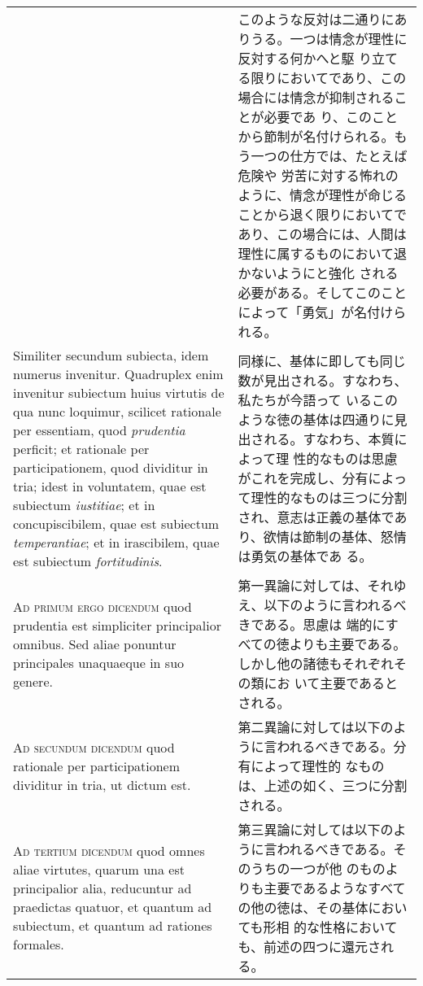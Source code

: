 \documentclass[10pt]{jsarticle}
\begin{document}
\begin{longtable}{p{21em}p{21em}}
&

このような反対は二通りにありうる。一つは情念が理性に反対する何かへと駆
り立てる限りにおいてであり、この場合には情念が抑制されることが必要であ
り、このことから節制が名付けられる。もう一つの仕方では、たとえば危険や
労苦に対する怖れのように、情念が理性が命じることから退く限りにおいてで
あり、この場合には、人間は理性に属するものにおいて退かないようにと強化
される必要がある。そしてこのことによって「勇気」が名付けられる。
 

\\



 Similiter secundum subiecta, idem numerus invenitur. Quadruplex enim
 invenitur subiectum huius virtutis de qua nunc loquimur, scilicet
 rationale per essentiam, quod {\itshape prudentia} perficit; et
 rationale per participationem, quod dividitur in tria; idest in
 voluntatem, quae est subiectum {\itshape iustitiae}; et in
 concupiscibilem, quae est subiectum {\itshape temperantiae}; et in
 irascibilem, quae est subiectum {\itshape fortitudinis}.


&

 同様に、基体に即しても同じ数が見出される。すなわち、私たちが今語って
 いるこのような徳の基体は四通りに見出される。すなわち、本質によって理
 性的なものは思慮がこれを完成し、分有によって理性的なものは三つに分割
 され、意志は正義の基体であり、欲情は節制の基体、怒情は勇気の基体であ
 る。


\\




{\scshape Ad primum ergo dicendum} quod prudentia est simpliciter
principalior omnibus. Sed aliae ponuntur principales unaquaeque in suo
genere.


&

 第一異論に対しては、それゆえ、以下のように言われるべきである。思慮は
 端的にすべての徳よりも主要である。しかし他の諸徳もそれぞれその類にお
 いて主要であるとされる。

\\




{\scshape Ad secundum dicendum} quod rationale per participationem
dividitur in tria, ut dictum est.


&

 第二異論に対しては以下のように言われるべきである。分有によって理性的
 なものは、上述の如く、三つに分割される。


\\


{\scshape Ad tertium dicendum} quod omnes aliae virtutes, quarum una
est principalior alia, reducuntur ad praedictas quatuor, et quantum ad
subiectum, et quantum ad rationes formales.


&

 第三異論に対しては以下のように言われるべきである。そのうちの一つが他
 のものよりも主要であるようなすべての他の徳は、その基体においても形相
 的な性格においても、前述の四つに還元される。

\end{longtable}
\newpage
\end{document}
